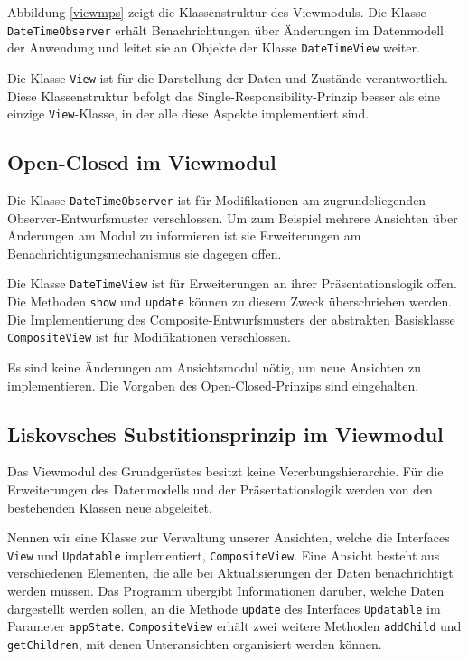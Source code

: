 \documentclass{vldb}
\begin{document}
Abbildung \ref{viewmps} zeigt die Klassenstruktur des Viewmoduls. Die Klasse \texttt{DateTimeObserver} erhält Benachrichtungen über Änderungen im Datenmodell der Anwendung und leitet sie an Objekte der Klasse \texttt{DateTimeView} weiter.

Die Klasse \texttt{View} ist für die Darstellung der Daten und Zustände verantwortlich. Diese Klassenstruktur befolgt das Single-Responsibility-Prinzip besser als eine einzige \texttt{View}-Klasse, in der alle diese Aspekte implementiert sind.

\subsection{Open-Closed im Viewmodul}
Die Klasse \texttt{DateTimeObserver} ist für Modifikationen am zugrundeliegenden Observer-Entwurfsmuster verschlossen. Um zum Beispiel mehrere Ansichten über Änderungen am Modul zu informieren ist sie Erweiterungen am Be\-nach\-rich\-ti\-gungs\-me\-cha\-nis\-mus sie da\-ge\-gen offen.

Die Klasse \texttt{DateTimeView} ist für Erweiterungen an ihrer Prä\-sen\-ta\-tions\-lo\-gik offen. Die Methoden \texttt{show} und \texttt{update} können zu diesem Zweck überschrieben werden. Die Implementierung des Composite-Entwurfsmusters der abstrakten Basisklasse \texttt{CompositeView} ist für Modifikationen verschlossen.

Es sind keine Än\-de\-run\-gen am Ansichtsmodul nötig, um neue Ansichten zu implementieren. Die Vorgaben des Open-Closed-Prinzips sind eingehalten.

\subsection{Liskovsches Substitionsprinzip im Viewmodul}
Das Viewmodul des Grundgerüstes besitzt keine Ver\-er\-bungs\-hie\-rar\-chie. Für die Erweiterungen des Datenmodells und der Prä\-sen\-ta\-tions\-lo\-gik werden von den bestehenden Klas\-sen neue ab\-ge\-lei\-tet.

Nennen wir eine Klasse zur Verwaltung unserer Ansichten, welche die Interfaces \texttt{View} und \texttt{Updatable} implementiert, \texttt{CompositeView}. Eine Ansicht besteht aus verschiedenen Ele\-men\-ten, die alle bei Aktualisierungen der Daten benach\-richtigt werden müssen. Das Programm über\-gibt Informationen darüber, welche Daten dargestellt werden sollen, an die Methode \texttt{update} des Interfaces \texttt{Updatable} im Para\-meter \texttt{appState}. \texttt{CompositeView} erhält zwei weitere Methoden \texttt{addChild} und \texttt{getChildren}, mit denen Unteransichten organisiert werden können.
\end{document}
